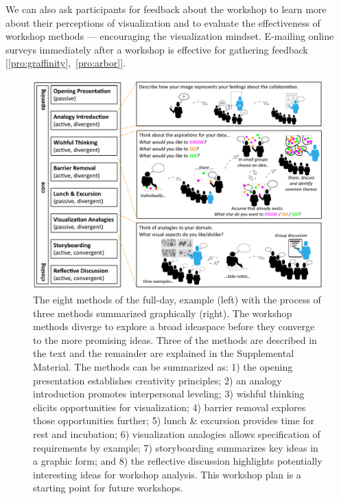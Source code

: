 We can also ask participants for feedback about the workshop to learn more about their perceptions of visualization and to evaluate the effectiveness of workshop methods --- encouraging the visualization mindset. E-mailing online surveys immediately after a workshop is effective for gathering feedback [\ref{pro:graffinity},~\ref{pro:arbor}].

\begin{figure}
    \centering
    \includegraphics[width=\columnwidth]{figures/workshop.pdf}
    \caption{The eight methods of the full-day, example \workshop (left) with the process of three methods summarized graphically (right). The workshop methods diverge to explore a broad ideaspace before they converge to the more promising ideas. Three of the methods are described in the text and the remainder are explained in the Supplemental Material. The methods can be summarized as: 1) the opening presentation establishes creativity principles; 2) an analogy introduction promotes interpersonal leveling; 3) wishful thinking elicits opportunities for visualization; 4) barrier removal explores those opportunities further; 5) lunch \& excursion provides time for rest and incubation; 6) visualization analogies allows specification of requirements by example; 7) storyboarding summarizes key ideas in a graphic form; and 8) the reflective discussion highlights potentially interesting ideas for workshop analysis. This workshop plan is a starting point for future workshops.}
    \label{fig:example-workshop}
\end{figure}

